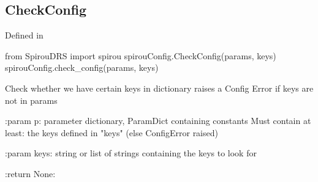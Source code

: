 \begin{minipage}{\textwidth}
\subsection{CheckConfig}

Defined in \spirouConfig{}

\begin{pythonbox}
from SpirouDRS import spirou
spirouConfig.CheckConfig(params, keys)
spirouConfig.check_config(params, keys)
\end{pythonbox}

\begin{pythondocstring}
Check whether we have certain keys in dictionary
raises a Config Error if keys are not in params

:param p: parameter dictionary, ParamDict containing constants
    Must contain at least:
        the keys defined in "keys" (else ConfigError raised)

:param keys: string or list of strings containing the keys to look for

:return None:
\end{pythondocstring}
\end{minipage}

